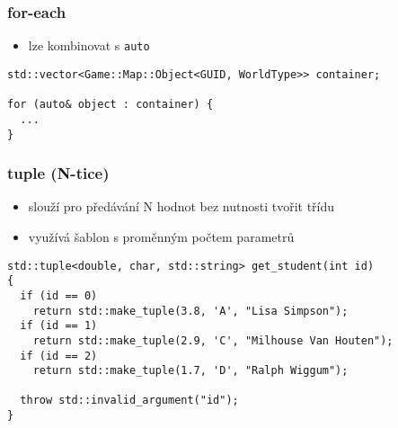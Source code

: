 \begin{frame}[fragile]
\frametitle{for-each}
\begin{block}{}
\begin{itemize}
\item lze kombinovat s \lstinline|auto|
\end{itemize}
\end{block}

\begin{yesblock}
\begin{lstlisting}
std::vector<Game::Map::Object<GUID, WorldType>> container;

for (auto& object : container) {
  ... 
}
\end{lstlisting}
\end{yesblock}
\end{frame}





\begin{frame}[fragile]
\frametitle{tuple (N-tice)}

\begin{bonusblock}{}
\begin{itemize}
\item slouží pro předávání N hodnot bez nutnosti tvořit třídu
\item využívá šablon s proměnným počtem parametrů
\end{itemize}
\end{bonusblock}

\begin{yesblock}
\begin{lstlisting}[basicstyle=\small]
std::tuple<double, char, std::string> get_student(int id)
{
  if (id == 0) 
    return std::make_tuple(3.8, 'A', "Lisa Simpson");  
  if (id == 1) 
    return std::make_tuple(2.9, 'C', "Milhouse Van Houten");  
  if (id == 2) 
    return std::make_tuple(1.7, 'D', "Ralph Wiggum");
  
  throw std::invalid_argument("id");
}
\end{lstlisting}
\end{yesblock}
\end{frame}


